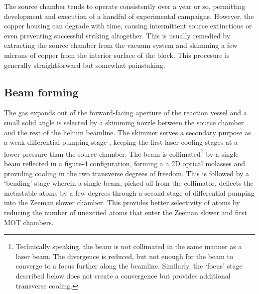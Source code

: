 	The source chamber tends to operate consistently over a year or so, permitting development and execution of a handful of experimental campaigns. However, the copper housing can degrade with time, causing intermittent source extinctions or even preventing successful striking altogether. This is usually remedied by extracting the source chamber from the vacuum system and skimming a few microns of copper from the interior surface of the block. This procesure is generally straightforward but somewhat painstaking. 

\subsection*{Beam forming}

	The gas expands out of the forward-facing aperture of the reaction vessel and a small solid angle is selected by a skimming nozzle between the source chamber and the rest of the helium beamline. The skimmer serves a secondary purpose as a weak differential pumping stage , keeping the first laser cooling stages at a lower pressure than the source chamber. The beam is collimated\footnote{Technically speaking, the beam is not collimated in the same manner as a laser beam. The divergence is reduced, but not enough for the beam to converge to a focus further along the beamline. Similarly, the `focus' stage described below does not create a convergence but provides additional transverse cooling.} by a single beam reflected in a figure-4 configuration, forming a a 2D optical molasses\cite{Lett81,rooijakkers96} and providing cooling in the two transverse degrees of freedom. This is followed by a `bending' stage wherein a single beam, picked off from the collimator, deflects the metastable atoms by a few degrees through a second stage of differential pumping into the Zeeman slower chamber. This provides better selectivity of \mhe atoms by reducing the number of unexcited atoms that enter the Zeeman slower and first MOT chambers. 

